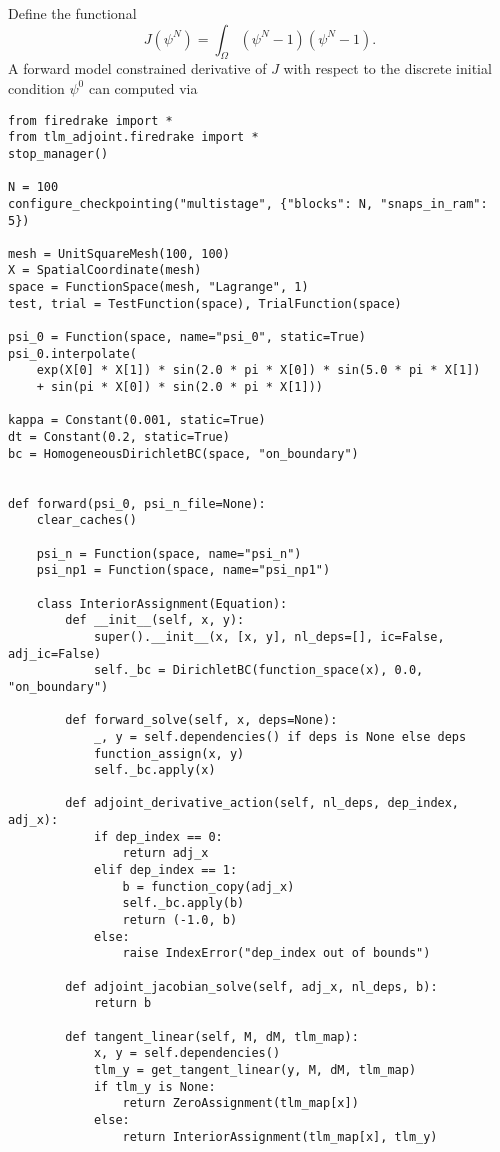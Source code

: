 \documentclass[11pt]{article}
\begin{document}
Define the functional
\begin{equation*}
  J \left( \psi^N \right) = \int_\Omega \left( \psi^N - 1 \right) \left( \psi^N - 1 \right).
\end{equation*}
A forward model constrained derivative of $J$ with respect to the discrete
initial condition $\psi^0$ can computed via
\begin{lstlisting}
from firedrake import *
from tlm_adjoint.firedrake import *
stop_manager()

N = 100
configure_checkpointing("multistage", {"blocks": N, "snaps_in_ram": 5})

mesh = UnitSquareMesh(100, 100)
X = SpatialCoordinate(mesh)
space = FunctionSpace(mesh, "Lagrange", 1)
test, trial = TestFunction(space), TrialFunction(space)

psi_0 = Function(space, name="psi_0", static=True)
psi_0.interpolate(
    exp(X[0] * X[1]) * sin(2.0 * pi * X[0]) * sin(5.0 * pi * X[1])
    + sin(pi * X[0]) * sin(2.0 * pi * X[1]))

kappa = Constant(0.001, static=True)
dt = Constant(0.2, static=True)
bc = HomogeneousDirichletBC(space, "on_boundary")


def forward(psi_0, psi_n_file=None):
    clear_caches()

    psi_n = Function(space, name="psi_n")
    psi_np1 = Function(space, name="psi_np1")

    class InteriorAssignment(Equation):
        def __init__(self, x, y):
            super().__init__(x, [x, y], nl_deps=[], ic=False, adj_ic=False)
            self._bc = DirichletBC(function_space(x), 0.0, "on_boundary")

        def forward_solve(self, x, deps=None):
            _, y = self.dependencies() if deps is None else deps
            function_assign(x, y)
            self._bc.apply(x)

        def adjoint_derivative_action(self, nl_deps, dep_index, adj_x):
            if dep_index == 0:
                return adj_x
            elif dep_index == 1:
                b = function_copy(adj_x)
                self._bc.apply(b)
                return (-1.0, b)
            else:
                raise IndexError("dep_index out of bounds")

        def adjoint_jacobian_solve(self, adj_x, nl_deps, b):
            return b

        def tangent_linear(self, M, dM, tlm_map):
            x, y = self.dependencies()
            tlm_y = get_tangent_linear(y, M, dM, tlm_map)
            if tlm_y is None:
                return ZeroAssignment(tlm_map[x])
            else:
                return InteriorAssignment(tlm_map[x], tlm_y)


\end{lstlisting}
\end{document}
